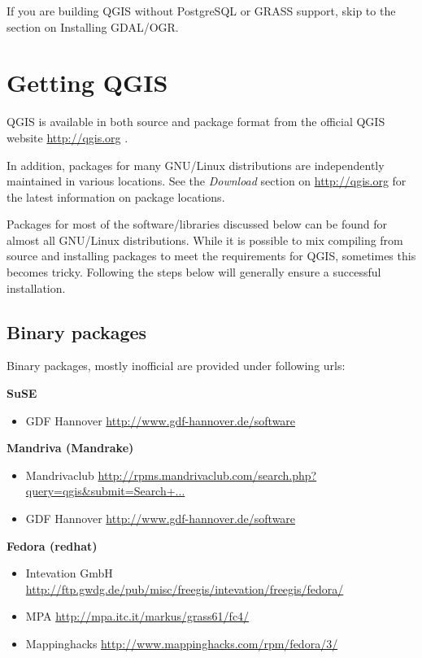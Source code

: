 If you are building QGIS without PostgreSQL or GRASS support, skip to the
section on Installing GDAL/OGR. 

%
%
\section{Getting QGIS}\label{sec:getqgis}

QGIS is available in both source and package format from
the official QGIS website \url{http://qgis.org} \cite{QGISweb}. 

In addition, packages for many GNU/Linux distributions are independently
maintained in various locations. See the \textit{Download} section on
\url{http://qgis.org} for the latest information on package locations.

Packages for most of the software/libraries discussed below can be found
for almost all GNU/Linux distributions. While it is possible to mix compiling
from source and installing packages to meet the requirements for QGIS,
sometimes this becomes tricky. Following the steps below will generally
ensure a successful installation. 

\subsection{Binary packages}\label{label_binaries}

Binary packages, mostly inofficial are provided under following urls:

\textbf{SuSE}

\begin{itemize}
\item GDF Hannover \url{http://www.gdf-hannover.de/software}
\end{itemize}

\textbf{Mandriva (Mandrake)}

\begin{itemize}
\item Mandrivaclub \url{http://rpms.mandrivaclub.com/search.php?query=qgis&submit=Search+...}
\item GDF Hannover \url{http://www.gdf-hannover.de/software}
\end{itemize}

\textbf{Fedora (redhat)}

\begin{itemize}
\item Intevation GmbH \url{http://ftp.gwdg.de/pub/misc/freegis/intevation/freegis/fedora/}
\item MPA \url{http://mpa.itc.it/markus/grass61/fc4/}
\item Mappinghacks \url{http://www.mappinghacks.com/rpm/fedora/3/}
\end{itemize}

